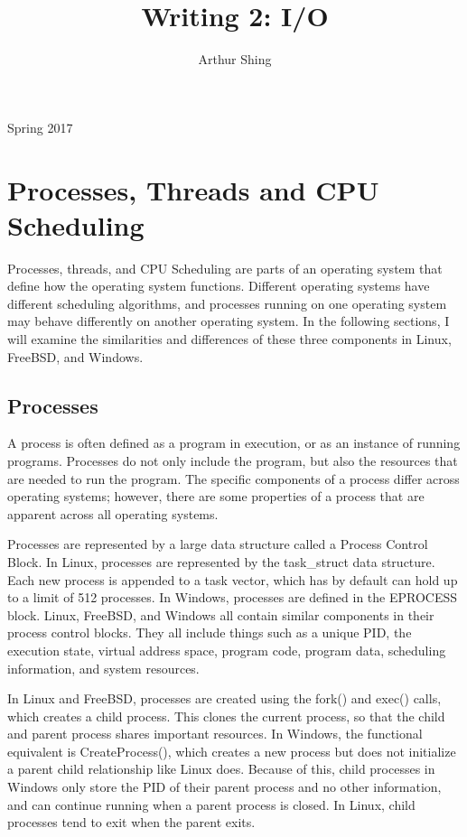 \documentclass[journal, letterpaper, draftclsnofoot, onecolumn, 10pt]{journal}
\begin{document}
\title{Writing 2: I/O}
\author{Arthur Shing}


\begin{titlepage}
    \centering
    \maketitle
    \large Spring 2017



\end{titlepage}
\tableofcontents
\clearpage


\section{Processes, Threads and CPU Scheduling}

Processes, threads, and CPU Scheduling are parts of an operating system that define how the operating system functions. Different operating systems have different scheduling algorithms, and processes running on one operating system may behave differently on another operating system. In the following sections, I will examine the similarities and differences of these three components in Linux, FreeBSD, and Windows.

\subsection{Processes}

A process is often defined as a program in execution, or as an instance of running programs. Processes do not only include the program, but also the resources that are needed to run the program. The specific components of a process differ across operating systems; however, there are some properties of a process that are apparent across all operating systems.

Processes are represented by a large data structure called a Process Control Block. In Linux, processes are represented by the task\_struct data structure. Each new process is appended to a task vector, which has by default can hold up to a limit of 512 processes. In Windows, processes are defined in the EPROCESS block.  Linux, FreeBSD, and Windows all contain similar components in their process control blocks. They all include things such as a unique PID, the execution state, virtual address space, program code, program data, scheduling information, and system resources.

In Linux and FreeBSD, processes are created using the fork() and exec() calls, which creates a child process. This clones the current process, so that the child and parent process shares important resources. In Windows, the functional equivalent is CreateProcess(), which creates a new process but does not initialize a parent child relationship like Linux does. Because of this, child processes in Windows only store the PID of their parent process and no other information, and can continue running when a parent process is closed. In Linux, child processes tend to exit when the parent exits.
\end{document}
